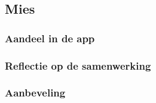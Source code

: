 \documentclass[dutch]{report}
\begin{document}
	\subsection{Mies}

	\subsubsection{Aandeel in de app}
	\subsubsection{Reflectie op de samenwerking}
	\subsubsection{Aanbeveling}
\end{document}
